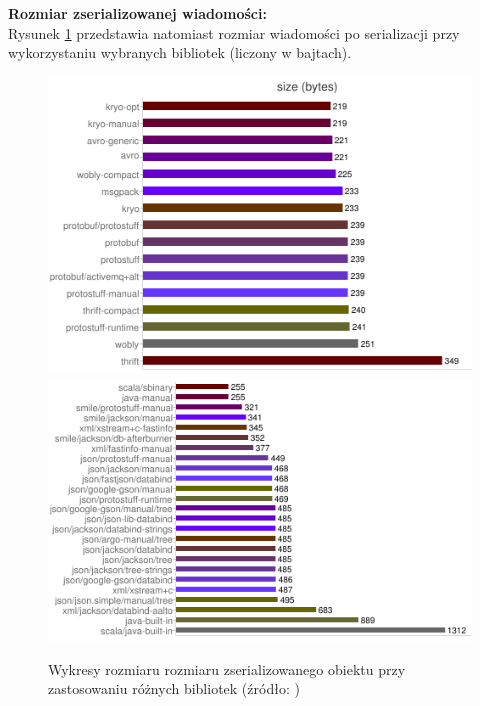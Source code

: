 \newpage
\textbf{Rozmiar zserializowanej wiadomości:}\\
Rysunek \ref{serializers2} przedstawia natomiast rozmiar wiadomości po serializacji przy wykorzystaniu wybranych bibliotek (liczony w bajtach).

\begin{figure}[ch!]
 \includegraphics[scale=0.8]{serialized_size_1}
 \includegraphics[scale=1]{serialized_size_2} 
 \caption{Wykresy rozmiaru rozmiaru zserializowanego obiektu przy zastosowaniu różnych bibliotek (źródło: \cite{Jvmserializers})}
 \label{serializers2}
\end{figure}

